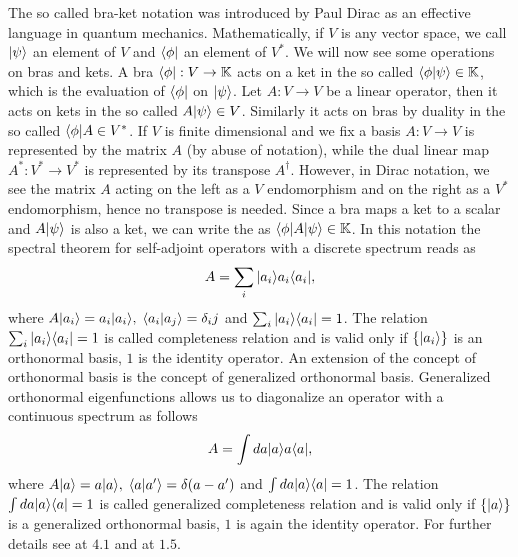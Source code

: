 \documentclass[../1.tex]{subfiles}
\begin{document}
   
    The so called bra-ket notation was introduced by Paul Dirac as an effective language in quantum mechanics.
    Mathematically, if $V$ is any vector space, we call  $| \psi \rangle$ an element of $V$ and  $\langle \phi |$ an element of $V^*$.
    We will now see some operations on bras and kets.
    A bra $\langle \phi | : V \to \mathbb{K}$ acts on a ket in the so called  $\langle \phi | \psi \rangle \in \mathbb{K}$, which is the evaluation of
    $\langle \phi |$ on $| \psi \rangle$.
    Let $A : V \to V$ be a linear operator, then it acts on kets in the so called  $A| \psi \rangle \in V$.
    Similarly it acts on bras by duality in the so called  $\langle \phi |A \in V^*$.
    If $V$ is finite dimensional and we fix a basis $A: V \to V$ is represented by the matrix $A$ (by abuse of notation),
    while the dual linear map $A^* : V^* \to V^*$ is represented by its transpose $A^\dagger$.
    However, in Dirac notation, we see the matrix $A$ acting on the left as a $V$ endomorphism and on the right as a $V^*$ endomorphism,
    hence no transpose is needed.
    Since a bra maps a ket to a scalar and $A| \psi \rangle$ is also a ket, we can write the  as $\langle \phi |A| \psi \rangle \in \mathbb{K}$.
    In this notation the spectral theorem for self-adjoint operators with a discrete spectrum reads as
    \[ A = \sum_i | a_i \rangle a_i\langle a_i |, \]
    where $A | a_i \rangle = a_i | a_i \rangle, \; \langle a_i | a_j \rangle = \delta_ij$ and $\sum_i | a_i \rangle \langle a_i | = 1$.
    The relation $\sum_i | a_i \rangle \langle a_i | = 1$ is called completeness relation and
    is valid only if $\{ | a_i \rangle\}$ is an orthonormal basis, $1$ is the identity operator.
    An extension of the concept of orthonormal basis is the concept of generalized orthonormal basis.
    Generalized orthonormal eigenfunctions allows us to diagonalize an operator with a continuous spectrum as follows
    \[ A = \int da | a \rangle a\langle a |, \]
    where $A | a \rangle = a| a \rangle, \; \langle a | a' \rangle = \delta(a-a')$ and $\int da | a \rangle \langle a | = 1$.
    The relation $\int da | a \rangle \langle a | = 1$ is called generalized completeness relation and
    is valid only if $\{ | a \rangle\}$ is a generalized orthonormal basis, $1$ is again the identity operator.
    For further details see \cite{axqft} at $4.1$ and at $1.5$.
\end{document}
